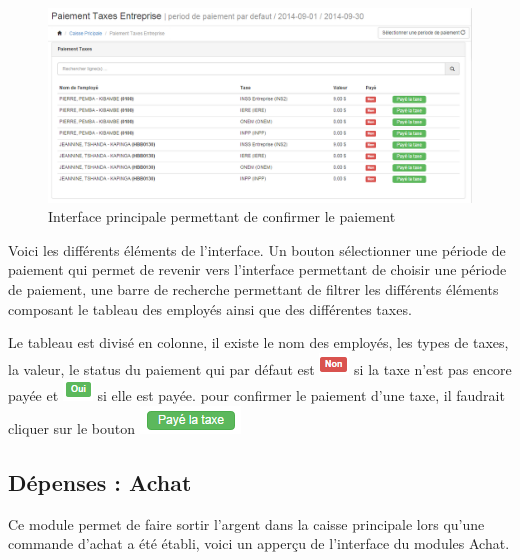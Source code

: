 \documentclass[12pt,a4paper]{report}
\begin{document}
\begin{figure}[h]
\begin{center}
\includegraphics[width=14cm]{pic/PaieTaxesEntre2.png}
\end{center}
\caption{Interface principale permettant de confirmer le paiement}
\label{Interface principale permettant de confirmer le paiement}
\end{figure}


Voici les différents éléments de l'interface. Un bouton sélectionner une période de paiement qui permet de revenir vers l'interface permettant de choisir une période de paiement, une barre de recherche permettant de filtrer les différents éléments composant le tableau des employés ainsi que des différentes taxes.

Le tableau est divisé en colonne, il existe le nom des employés, les types de taxes, la valeur, le status du paiement qui par défaut est \includegraphics[scale=0.7]{pic/NonTaxes.png} si la taxe n'est pas encore payée et \includegraphics[scale=0.7]{pic/OuiTaxes.png} si elle est payée. pour confirmer le paiement d'une taxe, il faudrait cliquer sur le bouton \includegraphics[scale=0.7]{pic/PayeTaxe.png}

\subsection{Dépenses : Achat}
Ce module permet de faire sortir l'argent dans la caisse principale lors qu'une commande d'achat a été établi, voici un apperçu de l'interface du modules Achat.
\end{document}
